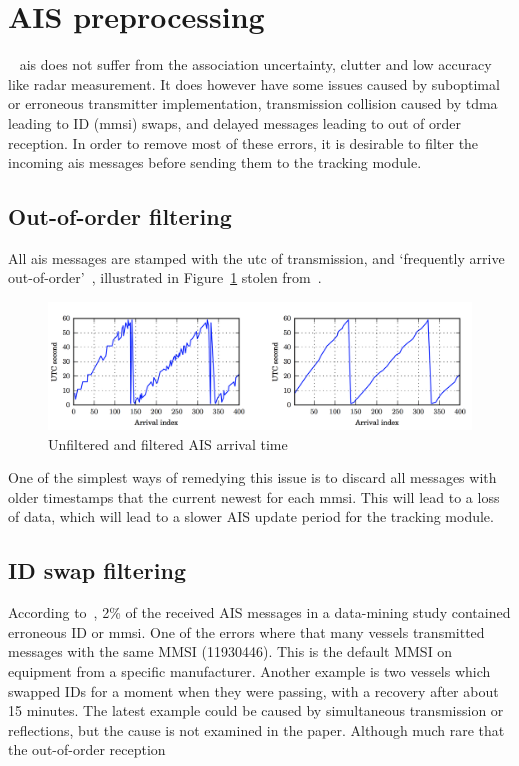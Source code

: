 \section{AIS preprocessing}~\label{sec:ais_preprocessing}
\Gls{ais} does not suffer from the association uncertainty, clutter and low accuracy like radar measurement. It does however have some issues caused by suboptimal or erroneous transmitter implementation, transmission collision caused by \gls{tdma} leading to ID (\gls{mmsi}) swaps, and delayed messages leading to out of order reception. In order to remove most of these errors, it is desirable to filter the incoming \gls{ais} messages before sending them to the tracking module.

\subsection{Out-of-order filtering}
All \gls{ais} messages are stamped with the \gls{utc} of transmission, and `frequently arrive out-of-order'~\cite{Wilthil}, illustrated in Figure~\ref{fig:out_of_order_ais} stolen from~\cite{Wilthil}.
\begin{figure}[H]
\centering
\includegraphics[width = .9\textwidth]{Figures/out_of_order_ais.png}
\caption{Unfiltered and filtered AIS arrival time~\cite{Wilthil}}\label{fig:out_of_order_ais}
\end{figure}
One of the simplest ways of remedying this issue is to discard all messages with older timestamps that the current newest for each \gls{mmsi}. This will lead to a loss of data, which will lead to a slower AIS update period for the tracking module.

\subsection{ID swap filtering}
According to~\cite{Harati-Mokhtari2007}, 2\% of the received AIS messages in a data-mining study contained erroneous ID or \gls{mmsi}. One of the errors where that many vessels transmitted messages with the same MMSI (11930446). This is the default MMSI on equipment from a specific manufacturer. Another example is two vessels which swapped IDs for a moment when they were passing, with a recovery after about 15 minutes. The latest example could be caused by simultaneous transmission or reflections, but the cause is not examined in the paper. Although much rare that the out-of-order reception   

